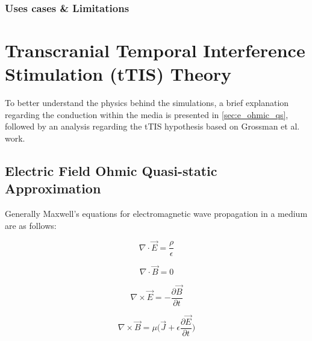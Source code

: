 \subsubsection{Uses cases \& Limitations}


\section{Transcranial Temporal Interference Stimulation (tTIS) Theory}

To better understand the physics behind the simulations, a brief explanation regarding the conduction within the media is presented in \autoref{sec:e_ohmic_qs}, followed by an analysis regarding the \gls{tTIS} hypothesis based on Grossman et al.\cite{Grossman2017} work.

\subsection{Electric Field Ohmic Quasi-static Approximation}
\label{sec:e_ohmic_qs}

Generally Maxwell's equations for electromagnetic wave propagation in a medium are as follows:
\begin{center}
\begin{minipage}{.35\linewidth}
    \begin{equation}
        \nabla\cdot\vec{E}=\dfrac{\rho}{\epsilon}
    \end{equation}
\end{minipage}
\begin{minipage}{.35\linewidth}
    \begin{equation}
        \nabla\cdot\vec{B} = 0
    \end{equation}
\end{minipage}\break
\begin{minipage}{.35\linewidth}
    \begin{equation}
        \label{eq:maxwell_curl_e}
        \nabla\times\vec{E}=-\dfrac{\partial\vec{B}}{\partial t}
    \end{equation}
\end{minipage}
\begin{minipage}{.35\linewidth}
    \begin{equation}
        \nabla\times\vec{B} = \mu\Bigg(\vec{J} + \epsilon\dfrac{\partial\vec{E}}{\partial t}\Bigg)
    \end{equation}
\end{minipage}
\end{center}

